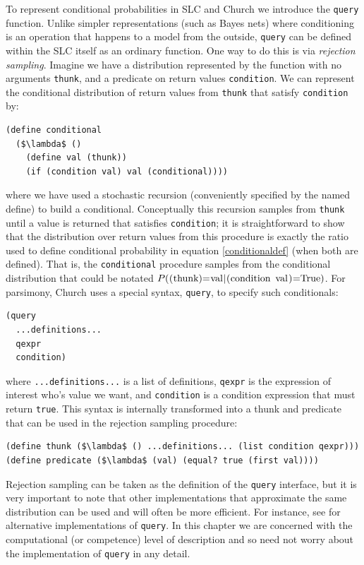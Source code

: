\documentclass[pdfextras]{handbook}
\begin{document}
To represent conditional probabilities in SLC and Church we introduce the \lstinline{query} function. Unlike simpler representations (such as Bayes nets) where conditioning is an operation that happens to a model from the outside, \lstinline{query} can be defined within the SLC itself as an ordinary function. One way to do this is via \emph{rejection sampling}. Imagine we have a distribution represented by the function with no arguments \lstinline{thunk}, and a predicate on return values \lstinline{condition}. We can represent the conditional distribution of return values from \lstinline{thunk} that satisfy \lstinline{condition} by:
\begin{lstlisting}[mathescape]
(define conditional 
  ($\lambda$ ()
    (define val (thunk))
    (if (condition val) val (conditional))))
\end{lstlisting}
where we have used a stochastic recursion (conveniently specified by the named define) to build a conditional. 
Conceptually this recursion samples from \lstinline{thunk} until a value is returned that satisfies \lstinline{condition}; it is straightforward to show that the distribution over return values from this procedure is exactly the ratio used to define conditional probability in equation \ref{conditionaldef} (when both are defined). That is, the \lstinline{conditional} procedure samples from the conditional distribution that could be notated $P(\text{\lstinline{(thunk)}}{=}\text{\lstinline{val}}|\text{\lstinline{(condition val)}}{=}\text{\lstinline{True}})$.
For parsimony, Church uses a special syntax, \lstinline{query}, to specify such conditionals: 
\begin{lstlisting}[mathescape]
(query
  ...definitions...
  qexpr
  condition)
\end{lstlisting}
where \lstinline{...definitions...} is a list of definitions, \lstinline{qexpr} is the expression of interest who's value we want, and \lstinline{condition} is a condition expression that must return \lstinline{true}. 
This syntax is internally transformed into a thunk and predicate that can be used in the rejection sampling procedure:
\begin{lstlisting}[mathescape]
(define thunk ($\lambda$ () ...definitions... (list condition qexpr)))
(define predicate ($\lambda$ (val) (equal? true (first val))))
\end{lstlisting}
Rejection sampling can be taken as the definition of the \lstinline{query} interface, but it is very important to note that other implementations that approximate the same distribution can be used and will often be more efficient. For instance, see \cite{wingate2011lightweight} for alternative implementations of \lstinline{query}. In this chapter we are concerned with the computational (or competence) level of description and so need not worry about the implementation of \lstinline{query} in any detail.
\end{document}
